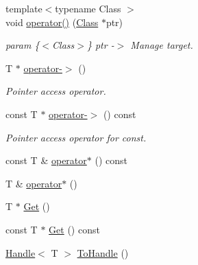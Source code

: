 \begin{DoxyCompactItemize}
{\footnotesize template$<$typename Class $>$ }\\void \hyperlink{classmocha_1_1_scoped_ptr_ae25ac571557fd0c071a88f70e78b2b55}{operator()} (\hyperlink{classmocha_1_1_class}{Class} $\ast$ptr)
\begin{DoxyCompactList}\small\item\em param \{$<$Class$>$\} ptr -\/$>$ Manage target. \end{DoxyCompactList}\item 
T $\ast$ \hyperlink{classmocha_1_1_scoped_ptr_ad8176a852377c775a8296f51f5f1ff32}{operator-\/$>$} ()
\begin{DoxyCompactList}\small\item\em Pointer access operator. \end{DoxyCompactList}\item 
const T $\ast$ \hyperlink{classmocha_1_1_scoped_ptr_a11949f0b071bc3cce230c66c4a49f58e}{operator-\/$>$} () const 
\begin{DoxyCompactList}\small\item\em Pointer access operator for const. \end{DoxyCompactList}\item 
const T \& \hyperlink{classmocha_1_1_scoped_ptr_ad340e33aae1adf7c0abc93001fc4ca8c}{operator$\ast$} () const 
\begin{DoxyCompactList}\small\item\em \end{DoxyCompactList}\item 
T \& \hyperlink{classmocha_1_1_scoped_ptr_aa4ecc1336a20b072ff56fb48958d8394}{operator$\ast$} ()
\item 
T $\ast$ \hyperlink{classmocha_1_1_scoped_ptr_a0decd32547be48f42a3f519a23aaa1d2}{Get} ()
\item 
const T $\ast$ \hyperlink{classmocha_1_1_scoped_ptr_a8444ecd777eda98d81ef5ef2ff082cad}{Get} () const 
\item 
\hyperlink{classmocha_1_1_handle}{Handle}$<$ T $>$ \hyperlink{classmocha_1_1_scoped_ptr_ac59175cfcb9b64902e0146ccd2b17e28}{ToHandle} ()
\end{DoxyCompactItemize}

